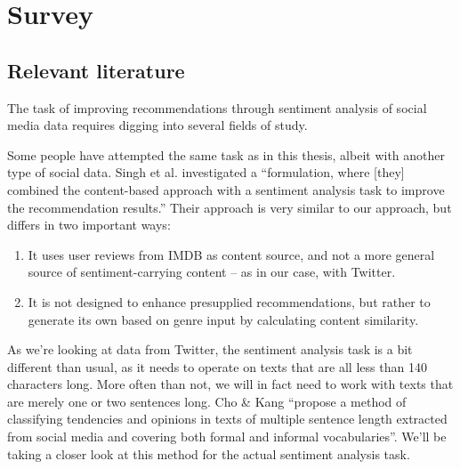 
\chapter{Survey} %

\label{Chapter2} %




\section{Relevant literature} %
\label{sec:relevant_literature}

The task of improving recommendations through sentiment analysis of social media data requires digging into several fields of study.

Some people have attempted the same task as in this thesis, albeit with another type of social data.
Singh et al. \cite{Singh2011} investigated a ``formulation, where [they] combined the content-based approach with a sentiment analysis task to improve the recommendation results.''
Their approach is very similar to our approach, but differs in two important ways:
\begin{enumerate}
  \item It uses user reviews from IMDB as content source, and not a more general source of sentiment-carrying content -- as in our case, with Twitter.
  \item It is not designed to enhance presupplied recommendations, but rather to generate its own based on genre input by calculating content similarity.
\end{enumerate}

As we're looking at data from Twitter, the sentiment analysis task is a bit different than usual, as it needs to operate on texts that are all less than 140 characters long. More often than not, we will in fact need to work with texts that are merely one or two sentences long.
Cho \& Kang \cite{ChoKang2012} ``propose a method of classifying tendencies and opinions in texts of multiple sentence length extracted from social media and covering both formal and informal vocabularies''.
We'll be taking a closer look at this method for the actual sentiment analysis task.


